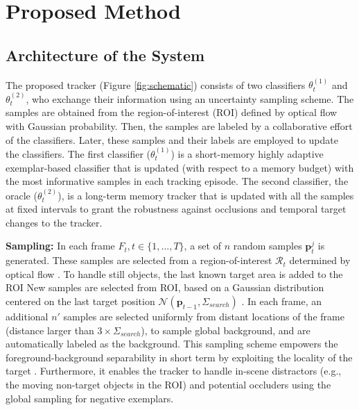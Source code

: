 \documentclass[conference,twoside]{IEEEtran}
\begin{document}
\section{Proposed Method}
\label{sect:proposed}

\subsection{Architecture of the System}
\label{sect:arch}
The proposed tracker (Figure \ref{fig:schematic}) consists of two classifiers $\theta^{(1)}_t$ and $\theta^{(2)}_t$, who exchange their information using an uncertainty sampling scheme. The samples are obtained from the region-of-interest (ROI) defined by optical flow with Gaussian probability. Then, the samples are labeled by a collaborative effort of the classifiers. Later, these samples and their labels are employed to update the classifiers. The first classifier ($\theta^{(1)}_t$) is a short-memory highly adaptive exemplar-based classifier that is updated (with respect to a memory budget) with the most informative samples in each tracking episode. The second classifier, the oracle ($\theta^{(2)}_t$), is a long-term memory tracker that is updated with all the samples at fixed intervals to grant the robustness against occlusions and temporal target changes to the tracker.

\textbf{Sampling:} In each frame $F_t , t \in \{1, \ldots , T\}$, a set of $n$ random samples $\mathbf{p}^j_t$ is generated. These samples are selected from a region-of-interest $\mathcal{R}_t$ determined by optical flow \cite{brox2009large}. To handle still objects, the last known target area is added to the ROI %
New samples are selected from ROI, based on a Gaussian distribution centered on the last target position $\mathcal{N}(\mathbf{p}_{t-1},\Sigma_{search})$%
. In each frame, an additional $n'$ samples are selected uniformly from distant locations of the frame (distance larger than $3\times\Sigma_{search}$), to sample global background, and are automatically labeled as the background. 
This sampling scheme empowers the foreground-background separability in short term by exploiting the locality of the target \cite{hare2011struck}. Furthermore, it enables the tracker to handle in-scene distractors (e.g., the moving non-target objects in the ROI) and potential occluders using the global sampling for negative exemplars. 
\end{document}
